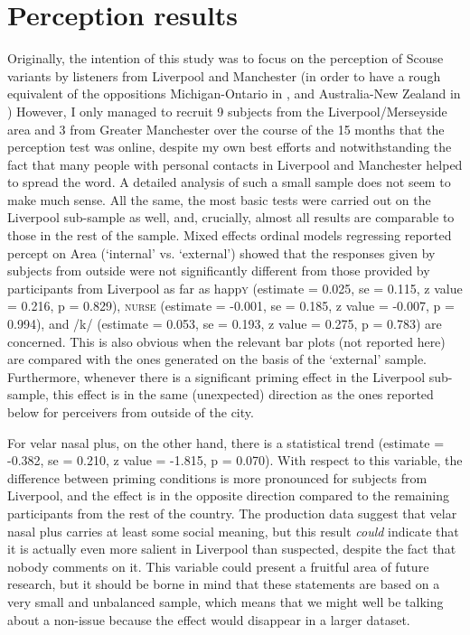 \chapter{Perception results}
\label{ch.perc_res}

Originally, the intention of this study was to focus on the perception of Scouse variants by listeners from Liverpool and Manchester (in order to have a rough equivalent of the oppositions Michigan-Ontario in \citealt{niedzielski1999}, and Australia-New Zealand in \citealt{hayetal2006a})
However, I only managed to recruit 9 subjects from the Liverpool/Merseyside area and 3 from Greater Manchester over the course of the 15 months that the perception test was online, despite my own best efforts and notwithstanding the fact that many people with personal contacts in Liverpool and Manchester helped to spread the word.
A detailed analysis of such a small sample does not seem to make much sense.
All the same, the most basic tests were carried out on the Liverpool sub-sample as well, and, crucially, almost all results are comparable to those in the rest of the sample.
Mixed effects ordinal models regressing reported percept on Area (\enquote*{internal} vs. \enquote*{external}) showed that the responses given by subjects from outside were not significantly different from those provided by participants from Liverpool as far as happ\textsc{y} (estimate = 0.025, se = 0.115, z value = 0.216, p = 0.829), \textsc{nurse} (estimate = -0.001, se = 0.185, z value = -0.007, p = 0.994), and /k/ (estimate = 0.053, se = 0.193, z value = 0.275, p = 0.783) are concerned.
This is also obvious when the relevant bar plots (not reported here) are compared with the ones generated on the basis of the `external' sample.
Furthermore, whenever there is a significant priming effect in the Liverpool sub-sample, this effect is in the same (unexpected) direction as the ones reported below for perceivers from outside of the city.

For velar nasal plus, on the other hand, there is a statistical trend (estimate = -0.382, se = 0.210, z value = -1.815, p = 0.070).
With respect to this variable, the difference between priming conditions is more pronounced for subjects from Liverpool, and the effect is in the opposite direction compared to the remaining participants from the rest of the country.
The production data suggest that velar nasal plus carries at least some social meaning, but this result \emph{could} indicate that it is actually even more salient in Liverpool than suspected, despite the fact that nobody comments on it.
This variable could present a fruitful area of future research, but it should be borne in mind that these statements are based on a very small and unbalanced sample, which means that we might well be talking about a non-issue because the effect would disappear in a larger dataset.

